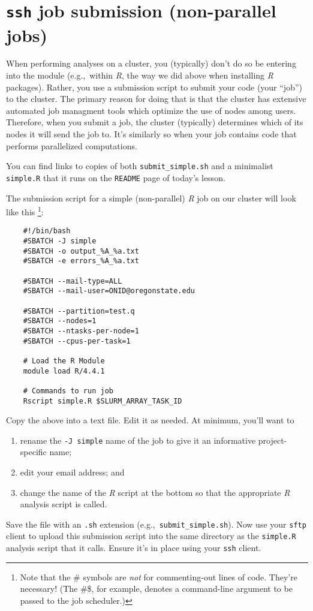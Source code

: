 \documentclass[12pt,letterpaper]{article}
\begin{document}
\section{\texttt{ssh} job submission (non-parallel jobs)}
When performing analyses on a cluster, you (typically) don't do so be entering into the module 
(e.g.,~within \emph{R}, the way we did above when installing \emph{R} packages).
Rather, you use a submission script to submit your code (your ``job'') to the cluster.
The primary reason for doing that is that the cluster has extensive automated job managment tools which optimize the use of nodes among users.
Therefore, when you submit a job, the cluster (typically) determines which of its nodes it will send the job to.
It's similarly so when your job contains code that performs parallelized computations.

\begin{tcolorbox}[breakable, enhanced, before upper={\parindent15pt}]
	\noindent
	You can find links to copies of both \texttt{submit\_simple.sh} and a minimalist \texttt{simple.R} that it runs on the \texttt{README} page of today's lesson.
\end{tcolorbox}

The submission script for a simple (non-parallel) \emph{R} job on our cluster will look like this
\unskip
\footnote{
	Note that the \# symbols are \emph{not} for commenting-out lines of code.  They're necessary!
	(The \#\$, for example, denotes a command-line argument to be passed to the job 
	scheduler.)}:
\begin{verbatim}
	#!/bin/bash
	#SBATCH -J simple
	#SBATCH -o output_%A_%a.txt
	#SBATCH -e errors_%A_%a.txt
	
	#SBATCH --mail-type=ALL
	#SBATCH --mail-user=ONID@oregonstate.edu
	
	#SBATCH --partition=test.q
	#SBATCH --nodes=1
	#SBATCH --ntasks-per-node=1
	#SBATCH --cpus-per-task=1
	
	# Load the R Module
	module load R/4.4.1
	
	# Commands to run job
	Rscript simple.R $SLURM_ARRAY_TASK_ID
\end{verbatim}

Copy the above into a text file.
Edit it as needed.  
At minimum, you'll want to
\begin{enumerate}
	\item rename the \texttt{-J simple} name of the job to give it an informative project-specific name;
	\item edit your email address; and	
	\item change the name of the \emph{R} script at the bottom so that the appropriate \emph{R} analysis script is called.
\end{enumerate}
Save the file with an \texttt{.sh} extension (e.g.,~\texttt{submit\_simple.sh}).
Now use your \texttt{sftp} client to upload this submission script into the same directory as the \texttt{simple.R} analysis script that it calls.
Ensure it's in place using your \texttt{ssh} client.
\end{document}
